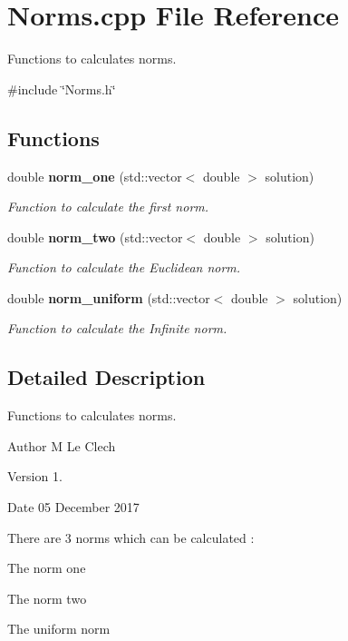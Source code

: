 \section{Norms.\+cpp File Reference}
\label{_norms_8cpp}


Functions to calculates norms.  


{\ttfamily \#include \char`\"{}Norms.\+h\char`\"{}}\newline
\subsection*{Functions}
\begin{DoxyCompactItemize}
\item 
double \textbf{ norm\+\_\+one} (std\+::vector$<$ double $>$ solution)
\begin{DoxyCompactList}\small\item\em Function to calculate the first norm. \end{DoxyCompactList}\item 
double \textbf{ norm\+\_\+two} (std\+::vector$<$ double $>$ solution)
\begin{DoxyCompactList}\small\item\em Function to calculate the Euclidean norm. \end{DoxyCompactList}\item 
double \textbf{ norm\+\_\+uniform} (std\+::vector$<$ double $>$ solution)
\begin{DoxyCompactList}\small\item\em Function to calculate the Infinite norm. \end{DoxyCompactList}\end{DoxyCompactItemize}


\subsection{Detailed Description}
Functions to calculates norms. 

\begin{DoxyAuthor}{Author}
M Le Clec\textquotesingle{}h 
\end{DoxyAuthor}
\begin{DoxyVersion}{Version}
1. 
\end{DoxyVersion}
\begin{DoxyDate}{Date}
05 December 2017
\end{DoxyDate}
There are 3 norms which can be calculated \+:
\begin{DoxyItemize}
\item The norm one
\item The norm two
\item The uniform norm 
\end{DoxyItemize}

